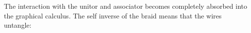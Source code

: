 The interaction with the unitor and associator becomes completely absorbed into the graphical calculus.
%
The self inverse of the braid means that the wires untangle:
